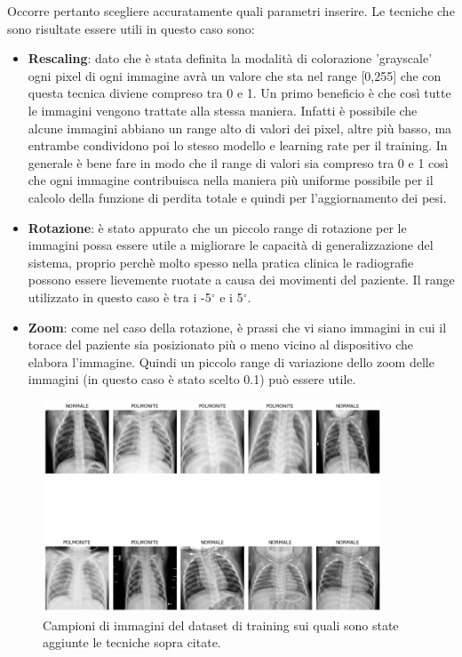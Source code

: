       Occorre pertanto scegliere accuratamente quali parametri inserire. Le tecniche che sono risultate essere utili in questo caso sono:
      \begin{itemize}
        \item \textbf{Rescaling}: dato che è stata definita la modalità di colorazione 'grayscale' ogni pixel di 
        ogni immagine avrà un valore che sta nel range [0,255] che con questa tecnica diviene compreso tra 0 e 1. 
        Un primo beneficio è che così tutte le immagini vengono trattate alla stessa maniera. 
        Infatti è possibile che alcune immagini abbiano un range alto di valori dei pixel, altre più basso,
         ma entrambe condividono poi lo stesso modello e learning rate per il training. 
        In generale è bene fare in modo che il range di valori sia compreso tra 0 e 1 così che ogni immagine
         contribuisca nella maniera più uniforme possibile per il calcolo della funzione di perdita totale e 
         quindi per l'aggiornamento dei pesi. 
        \item \textbf{Rotazione}: è stato appurato che un piccolo range di rotazione per le immagini possa essere
         utile a migliorare le capacità di generalizzazione del sistema, proprio perchè molto spesso nella pratica clinica
         le radiografie possono essere lievemente ruotate a causa dei movimenti del paziente. Il range utilizzato in questo caso è tra i 
         -5$^\circ$  e i 5$^\circ$.
         \item \textbf{Zoom}: come nel caso della rotazione, è prassi che vi siano immagini in cui il torace del paziente sia posizionato
         più o meno vicino al dispositivo che elabora l'immagine. Quindi un piccolo range di variazione dello zoom delle immagini (in questo caso è stato scelto 0.1) 
         può essere utile. 
        
      \end{itemize}


      
      \begin{figure}[H]
        \centering
        \includegraphics[width=0.9\textwidth]{Figures/best-augmented-images-pneumonia.png}
        \caption{\small{
        Campioni di immagini del dataset di training sui quali sono state aggiunte le tecniche sopra citate.
        } %
        } %
        \label{fi:dcalc}
    \end{figure}
      
